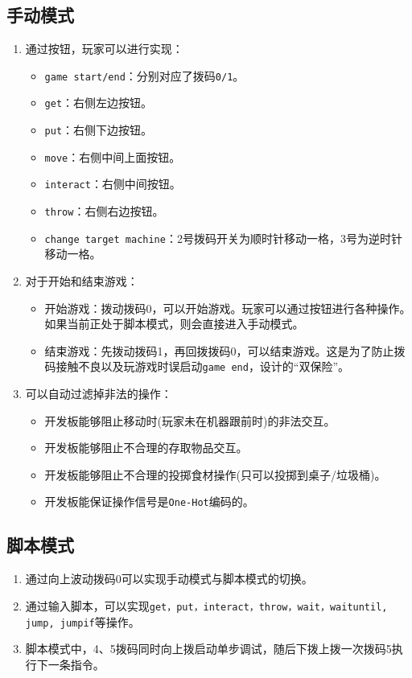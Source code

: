 \documentclass[12pt, a4paper]{ctexart}
\begin{document}
\subsection{手动模式}
\begin{enumerate}
	\item 通过按钮，玩家可以进行实现：
        \begin{itemize}
            \item \texttt{game start/end}：分别对应了拨码\texttt{0/1}。
            \item \texttt{get}：右侧左边按钮。
            \item \texttt{put}：右侧下边按钮。
            \item \texttt{move}：右侧中间上面按钮。
            \item \texttt{interact}：右侧中间按钮。
            \item \texttt{throw}：右侧右边按钮。
            \item \texttt{change target machine}：2号拨码开关为顺时针移动一格，3号为逆时针移动一格。
        \end{itemize}
	\item 对于开始和结束游戏：
        \begin{itemize}
            \item 开始游戏：拨动拨码0，可以开始游戏。玩家可以通过按钮进行各种操作。如果当前正处于脚本模式，则会直接进入手动模式。
            \item 结束游戏：先拨动拨码1，再回拨拨码0，可以结束游戏。这是为了防止拨码接触不良以及玩游戏时误启动\texttt{game end}，设计的“双保险”。
        \end{itemize}
	\item 可以自动过滤掉非法的操作：
        \begin{itemize}
            \item 开发板能够阻止移动时(玩家未在机器跟前时)的非法交互。
            \item 开发板能够阻止不合理的存取物品交互。
            \item 开发板能够阻止不合理的投掷食材操作(只可以投掷到桌子/垃圾桶)。
            \item 开发板能保证操作信号是\texttt{One-Hot}编码的。
        \end{itemize}
\end{enumerate}

\subsection{脚本模式}
\begin{enumerate}
	\item 通过向上波动拨码0可以实现手动模式与脚本模式的切换。
	\item 通过输入脚本，可以实现\texttt{get，put，interact，throw，wait，waituntil, jump, jumpif}等操作。
	\item 脚本模式中，4、5拨码同时向上拨启动单步调试，随后下拨上拨一次拨码5执行下一条指令。
\end{enumerate}
\end{document}
